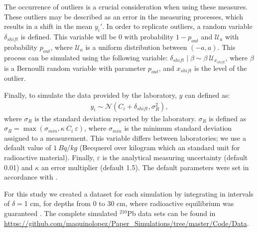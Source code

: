 \documentclass [10pt] {article}
\begin{document}
The occurrence of outliers is a crucial consideration when using these measures.
These outliers may be described as an error in the measuring processes, which results in a shift in the mean $y_i'$.
In order to replicate outliers, a random variable $\delta_{shift}$ is defined.
This variable will be $0$ with probability $1-p_{out}$ and $\mathcal{U}_a$ with probability $p_{out}$, where $\mathcal{U}_a$ is a uniform distribution between $(-a,a)$.
This process can be simulated using the following variable: $\delta_{shift}\mid\beta \sim \beta\ \mathcal{U}_{x_{shift}}$, where $\beta$ is a Bernoulli random variable with parameter $p_{out}$, and $x_{shift}$ is the level of the outlier. 

Finally, to simulate the data provided by the laboratory, $y$ can defined as:   
\begin{align}
	y_i\sim\mathcal{N}\left(C_{i} + \delta_{shift}, \sigma^2_{R} \right), 
\end{align}
where $\sigma_R$ is the standard deviation reported by the laboratory. 
$\sigma_R$ is defined as $\sigma_R= \max \left(\sigma_{min}, \kappa~C_i ~\varepsilon \right)$, where $\sigma_{min}$ is the minimum standard deviation assigned to a measurement. This variable differs between laboratories; we use a default value of $1~ Bq/kg$ (Becquerel over kilogram which an standard unit for radioactive material). 
Finally, $\varepsilon$ is the analytical measuring uncertainty (default 0.01) and $\kappa$ an error multiplier (default 1.5).
The default parameters were set in accordance with \citet{Blaauw2018}.


For this study we created a dataset for each simulation by integrating in intervals of $\delta =$1 cm, for depths from  0 to 30 cm, where radioactive equilibrium was guaranteed \citep{Aquino2018}.
The complete simulated $^{210}$Pb data sets can be found in \url{https://github.com/maquinolopez/Paper\_Simulations/tree/master/Code/Data}.
\end{document}
